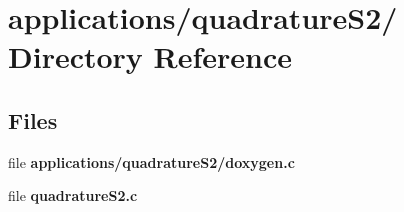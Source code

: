 \hypertarget{dir_000014}{
\section{applications/quadrature\-S2/ Directory Reference}
\label{dir_000014}
}
\subsection*{Files}
\begin{CompactItemize}
\item 
file {\bf applications/quadrature\-S2/doxygen.c}
\item 
file {\bf quadrature\-S2.c}
\end{CompactItemize}
